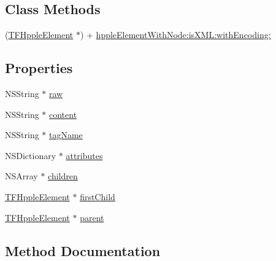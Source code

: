 \subsection*{Class Methods}
\begin{DoxyCompactItemize}
\item 
(\hyperlink{interface_t_f_hpple_element}{T\+F\+Hpple\+Element} $\ast$) + \hyperlink{interface_t_f_hpple_element_a617d6eb7c9674ebfced840c1764028a5}{hpple\+Element\+With\+Node\+:is\+X\+M\+L\+:with\+Encoding\+:}
\end{DoxyCompactItemize}
\subsection*{Properties}
\begin{DoxyCompactItemize}
\item 
N\+S\+String $\ast$ \hyperlink{interface_t_f_hpple_element_a67a2f29f7e31c69d23e2365f7602241a}{raw}
\item 
N\+S\+String $\ast$ \hyperlink{interface_t_f_hpple_element_a92efb1ac82fa89fe4221a7f2363332ea}{content}
\item 
N\+S\+String $\ast$ \hyperlink{interface_t_f_hpple_element_a25cfdaa376701dc9817c1b2c7e135b75}{tag\+Name}
\item 
N\+S\+Dictionary $\ast$ \hyperlink{interface_t_f_hpple_element_aea9972700f45beb7197f03b20cfbd3d2}{attributes}
\item 
N\+S\+Array $\ast$ \hyperlink{interface_t_f_hpple_element_a6023a02b0f33943aad395504981b24ba}{children}
\item 
\hyperlink{interface_t_f_hpple_element}{T\+F\+Hpple\+Element} $\ast$ \hyperlink{interface_t_f_hpple_element_afb83964b315f36faa2ad67dc71645ada}{first\+Child}
\item 
\hyperlink{interface_t_f_hpple_element}{T\+F\+Hpple\+Element} $\ast$ \hyperlink{interface_t_f_hpple_element_a8fc33c0ff70941d9638f05632ad6ba5d}{parent}
\end{DoxyCompactItemize}


\subsection{Method Documentation}
\hypertarget{interface_t_f_hpple_element_a33bda9b36b3a6b6cb8aa3191e4d8081d}{}
